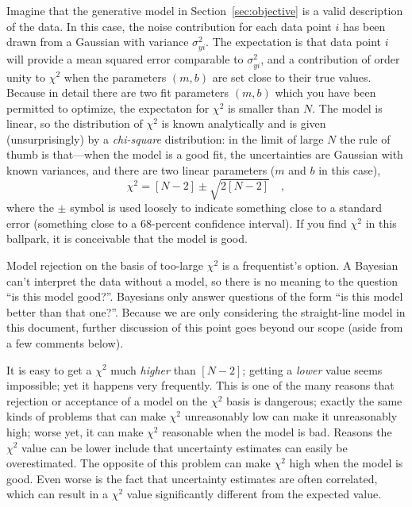 \documentclass[12pt,twoside]{article}
\newcommand{\documentname}{document}
\newcommand{\sectionname}{Section}
\newcounter{problem}
\begin{document}
Imagine that the generative model in \sectionname~\ref{sec:objective}
is a valid description of the data.  In this case, the noise
contribution for each data point $i$ has been drawn from a Gaussian
with variance $\sigma_{yi}^2$.  The expectation is that data point $i$
will provide a mean squared error comparable to $\sigma_{yi}^2$, and a
contribution of order unity to $\chi^2$ when the parameters $(m,b)$
are set close to their true values.  Because in detail there are two
fit parameters $(m,b)$ which you have been permitted to optimize, the
expectaton for $\chi^2$ is smaller than $N$. The model is linear, so
the distribution of $\chi^2$ is known analytically and is given
(unsurprisingly) by a \emph{chi-square} distribution: in the limit of
large $N$ the rule of thumb is that---when the model is a good fit,
the uncertainties are Gaussian with known variances, and there are two
linear parameters ($m$ and $b$ in this case),
\begin{equation}
\chi^2 = [N-2] \pm \sqrt{2[N-2]} \quad ,
\end{equation}
where the $\pm$ symbol is used loosely to indicate something close to
a standard error (something close to a 68-percent confidence
interval).  If you find $\chi^2$ in this ballpark, it is conceivable
that the model is good.

Model rejection on the basis of too-large $\chi^2$ is a frequentist's
option.  A Bayesian can't interpret the data without a model, so there
is no meaning to the question ``is this model good?''.  Bayesians only
answer questions of the form ``is this model better than that one?''.
Because we are only considering the straight-line model in this
\documentname, further discussion of this point goes beyond our scope
(aside from a few comments below).

It is easy to get a $\chi^2$ much \emph{higher} than $[N-2]$; getting
a \emph{lower} value seems impossible; yet it happens very frequently.
This is one of the many reasons that rejection or acceptance of a
model on the $\chi^2$ basis is dangerous; exactly the same kinds of
problems that can make $\chi^2$ unreasonably low can make it
unreasonably high; worse yet, it can make $\chi^2$ reasonable when the
model is bad.  Reasons the $\chi^2$ value can be lower include that
uncertainty estimates can easily be overestimated. The opposite of
this problem can make $\chi^2$ high when the model is good. Even worse
is the fact that uncertainty estimates are often correlated, which can
result in a $\chi^2$ value significantly different from the expected
value.
\end{document}
